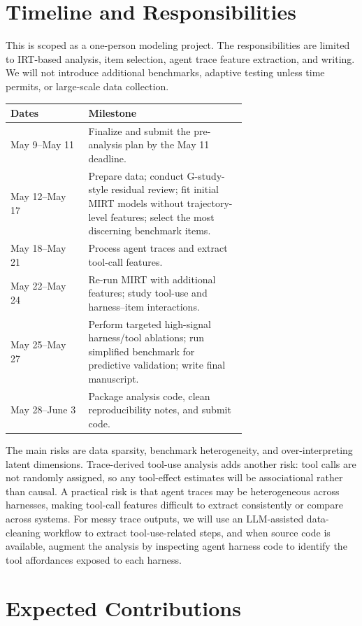 \documentclass{article}
\begin{document}
\section{Timeline and Responsibilities}

This is scoped as a one-person modeling project. The responsibilities are limited to IRT-based analysis, item selection, agent trace feature extraction, and writing. We will not introduce additional benchmarks, adaptive testing unless time permits, or large-scale data collection.

\begin{center}
\begin{tabular}{lp{0.67\linewidth}}
\toprule
Dates & Milestone \\
\midrule
May 9--May 11 & Finalize and submit the pre-analysis plan by the May 11 deadline. \\
May 12--May 17 & Prepare data; conduct G-study-style residual review; fit initial MIRT models without trajectory-level features; select the most discerning benchmark items. \\
May 18--May 21 & Process agent traces and extract tool-call features. \\
May 22--May 24 & Re-run MIRT with additional features; study tool-use and harness--item interactions. \\
May 25--May 27 & Perform targeted high-signal harness/tool ablations; run simplified benchmark for predictive validation; write final manuscript. \\
May 28--June 3 & Package analysis code, clean reproducibility notes, and submit code. \\
\bottomrule
\end{tabular}
\end{center}

The main risks are data sparsity, benchmark heterogeneity, and over-interpreting latent dimensions. Trace-derived tool-use analysis adds another risk: tool calls are not randomly assigned, so any tool-effect estimates will be associational rather than causal. A practical risk is that agent traces may be heterogeneous across harnesses, making tool-call features difficult to extract consistently or compare across systems. For messy trace outputs, we will use an LLM-assisted data-cleaning workflow to extract tool-use-related steps, and when source code is available, augment the analysis by inspecting agent harness code to identify the tool affordances exposed to each harness.

\section{Expected Contributions}
\end{document}
